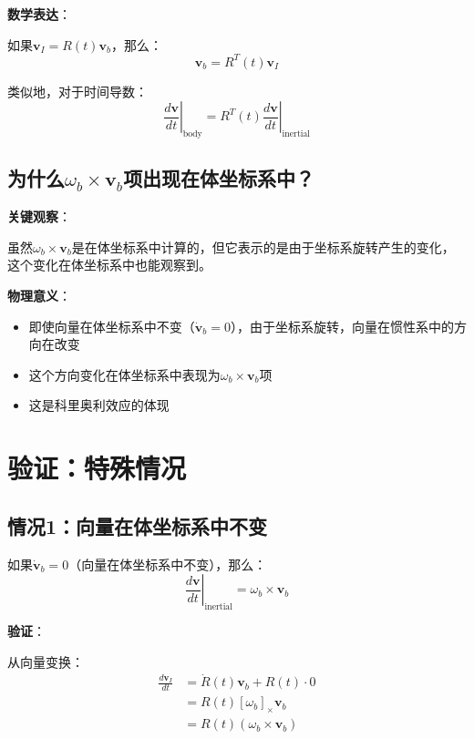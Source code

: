 \documentclass[12pt,a4paper]{article}
\begin{document}
\textbf{数学表达}：

如果$\bm{v}_I = R(t) \bm{v}_b$，那么：
\begin{equation}
\bm{v}_b = R^T(t) \bm{v}_I
\end{equation}

类似地，对于时间导数：
\begin{equation}
\left.\frac{d\bm{v}}{dt}\right|_{\text{body}} = R^T(t) \left.\frac{d\bm{v}}{dt}\right|_{\text{inertial}}
\end{equation}

\subsection{为什么$\omega_b \times \bm{v}_b$项出现在体坐标系中？}

\textbf{关键观察}：

虽然$\omega_b \times \bm{v}_b$是在体坐标系中计算的，但它表示的是由于坐标系旋转产生的变化，这个变化在体坐标系中也能观察到。

\textbf{物理意义}：

\begin{itemize}
\item 即使向量在体坐标系中不变（$\dot{\bm{v}}_b = 0$），由于坐标系旋转，向量在惯性系中的方向在改变
\item 这个方向变化在体坐标系中表现为$\omega_b \times \bm{v}_b$项
\item 这是科里奥利效应的体现
\end{itemize}

\section{验证：特殊情况}

\subsection{情况1：向量在体坐标系中不变}

如果$\dot{\bm{v}}_b = 0$（向量在体坐标系中不变），那么：
\begin{equation}
\left.\frac{d\bm{v}}{dt}\right|_{\text{inertial}} = \omega_b \times \bm{v}_b
\end{equation}

\textbf{验证}：

从向量变换：
\begin{align}
\frac{d\bm{v}_I}{dt} &= \dot{R}(t) \bm{v}_b + R(t) \cdot 0 \\
&= R(t) [\omega_b]_{\times} \bm{v}_b \\
&= R(t) (\omega_b \times \bm{v}_b)
\end{align}
\end{document}
